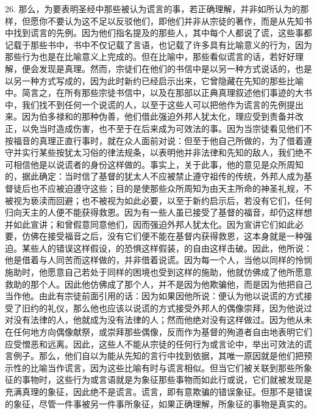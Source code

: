 26. 那么，为要表明圣经中那些被认为谎言的事，若正确理解，并非如所认为的那样，但愿你不要认为这不足以反驳他们，即他们并非从宗徒的著作，而是从先知书中找到谎言的先例。因为他们指名提及的那些人，其中每个人都说了谎，这些事都记载于那些书中，书中不仅记载了言语，也记载了许多具有比喻意义的行为，因为那些行为也是在比喻意义上完成的。但在比喻中，那些看似谎言的话，若好好理解，便会发现是真理。然而，宗徒们在他们的书信中是以另一种方式说话的，也是以另一种方式写成的，因为此时新约已经启示出来，它曾隐藏在先知的那些比喻中。简言之，在所有那些宗徒书信中，以及在那部以正典真理叙述他们事迹的大书中，我们找不到任何一个说谎的人，以至于这些人可以把他作为谎言的先例提出来。因为伯多禄和的那种伪善，他们借此强迫外邦人犹太化，理应受到责备并改正，以免当时造成伤害，也不至于在后来成为可效法的事。因为当宗徒看见他们不按福音的真理正直行事时，就在众人面前对说：但至于他自己所做的，为了借着遵守并实行某些按犹太习俗的律法规条，以表明他并非法律和先知的敌人，我们绝不可相信他是以说谎者的身份这样做的。事实上，关于此事，他的意见是众所周知的，据此确定：当时信了基督的犹太人不应被禁止遵守祖传的传统，外邦人成为基督徒后也不应被迫遵守这些；目的是使那些众所周知为由天主所命的神圣礼规，不被视为亵渎而回避；也不被视为如此必要，以至于新约启示后，若没有它们，任何归向天主的人便不能获得救恩。因为有一些人虽已接受了基督的福音，却仍这样想并如此宣讲；和曾假意同意他们，因而强迫外邦人犹太化。因为宣讲它们如此必要，仿佛在接受福音之后，没有它们便不能在基督内获得救恩，这本身就是一种强迫。某些人的错误这样假设，的恐惧这样假装，的自由这样击破。因此，他所说：他是借着与人同苦而这样做的，并非借着说谎。因为每一个人，当他以同样的怜悯施助时，他愿意自己若处于同样的困境也受到这样的施助，他就仿佛成了他所愿意救助的那个人。因此他仿佛成了那个人，并不是因为他欺骗他，而是因为他把自己当作他。由此有宗徒前面引用的话：因为如果因他所说：便认为他以说谎的方式接受了旧约的礼仪，那么他也应该以说谎的方式接受外邦人的偶像崇拜，因为他说过对没有法律的人，他就成为没有法律的人；然而他绝对没有这样做过。因为他从未在任何地方向偶像献祭，或崇拜那些偶像，反而作为基督的殉道者自由地表明它们应受憎恶和远离。因此，这些人不能从宗徒的任何行为或言论中，举出可效法的谎言例子。那么，他们自以为能从先知的言行中找到依据，其唯一原因就是他们把预示性的比喻当作谎言，因为这些比喻有时与谎言相似。但当它们被关联到那些所象征的事物时，这些行为或言语就是为象征那些事物而如此行或说，它们就被发现是充满真理的象征，因此绝不是谎言。谎言，即有意欺骗的错误象征。但那不是错误的象征，尽管一件事被另一件事所象征，如果正确理解，所象征的事物是真实的。\par


